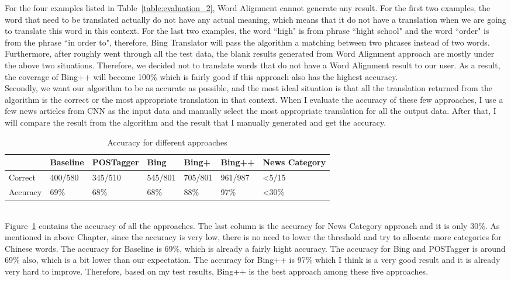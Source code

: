 \documentclass[11pt]{article}
\begin{document}
For the four examples listed in Table~\ref{table:evaluation_2}, Word Alignment cannot generate any result. For the first two examples, the word that need to be translated actually do not have any actual meaning, which means that it do not have a translation when we are going to translate this word in this context. For the last two examples, the word ``high" is from phrase ``hight school" and the word ``order" is from the phrase ``in order to", therefore, Bing Translator will pass the algorithm a matching between two phrases instead of two words. Furthermore, after roughly went through all the test data, the blank results generated from Word Alignment approach are mostly under the above two situations. Therefore, we decided not to translate words that do not have a Word Alignment result to our user. As a result, the coverage of Bing++ will become 100\% which is fairly good if this approach also has the highest accuracy.
\\
Secondly, we want our algorithm to be as accurate as possible, and the most ideal situation is that all the translation returned from the algorithm is the correct or the most appropriate translation in that context. When I evaluate the accuracy of these few approaches, I use a few news articles from CNN as the input data and manually select the most appropriate translation for all the output data. After that, I will compare the result from the algorithm and the result that I manually generated and get the accuracy.
\\
\begin{table}[ht]
  \caption{Accuracy for different approaches}
  \label{table:evaluation_3}
  \begin{tabular}{| p{2cm} | p{2cm} | p{2cm} | p{2cm} | p{2cm} | p{2cm} | p{2cm} |}
    \hline
     & Baseline & POSTagger & Bing & Bing+ & Bing++ & News Category \\
    \hline
    Correct & 400/580 & 345/510 & 545/801 & 705/801 & 961/987 & <5/15\\
    \hline
    Accuracy & 69\% & 68\% & 68\% & 88\% & 97\% & <30\% \\
    \hline
  \end{tabular}

\end{table}
\\
Figure~\ref{table:evaluation_3} contains the accuracy of all the approaches. The last column is the accuracy for News Category approach and it is only 30\%. As mentioned in above Chapter, since the accuracy is very low, there is no need to lower the threshold and try to allocate more categories for Chinese words. The accuracy for Baseline is 69\%, which is already a fairly hight accuracy. The accuracy for Bing and POSTagger is around 69\% also, which is a bit lower than our expectation. The accuracy for Bing++ is 97\% which I think is a very good result and it is already very hard to improve. Therefore, based on my test results, Bing++ is the best approach among these five approaches.
\\
\end{document}
